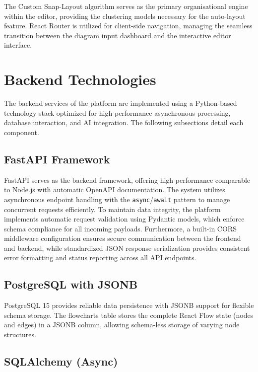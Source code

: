 \justifying
The Custom Snap-Layout algorithm serves as the primary 
organisational engine within the editor, providing the 
clustering models necessary for the auto-layout feature. 
React Router is utilized for client-side navigation, 
managing the seamless transition between the diagram input 
dashboard and the interactive editor interface.

\section{Backend Technologies}
\label{sec:backend-tech}

The backend services of the platform are implemented using a 
Python-based technology stack optimized for high-performance 
asynchronous processing, database interaction, and AI 
integration. The following subsections detail each 
component.

\subsection{FastAPI Framework}
\label{subsec:fastapi}

FastAPI serves as the backend framework, offering high 
performance comparable to Node.js with automatic OpenAPI 
documentation. The system utilizes asynchronous endpoint handling with the \texttt{async}/\texttt{await} pattern to manage concurrent requests efficiently. To maintain data integrity, the platform implements automatic request validation using Pydantic models, which enforce schema compliance for all incoming payloads. Furthermore, a built-in CORS middleware configuration ensures secure communication between the frontend and backend, while standardized JSON response serialization provides consistent error formatting and status reporting across all API endpoints.

\subsection{PostgreSQL with JSONB}
\label{subsec:postgresql}

PostgreSQL 15 provides reliable data persistence with JSONB 
support for flexible schema storage. The flowcharts table stores 
the complete React Flow state (nodes and edges) in a JSONB 
column, allowing schema-less storage of varying node 
structures.

\subsection{SQLAlchemy (Async)}
\label{subsec:sqlalchemy}


